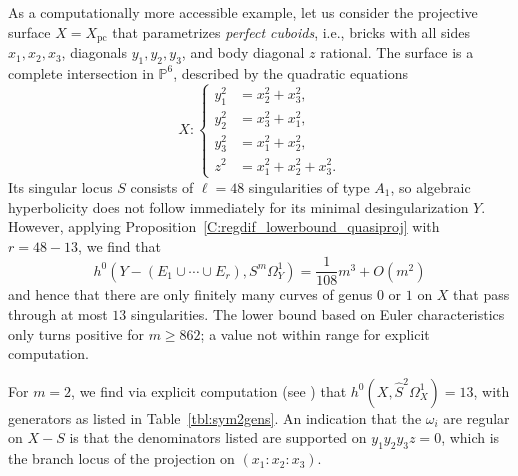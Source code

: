 \documentclass[12pt, reqno]{amsart}
\theoremstyle{definition}
\newcommand{\PP}{{\mathbb P}}
\newcommand{\Xpc}{X_\mathrm{pc}}
\numberwithin{equation}{section}
\numberwithin{table}{section}
\begin{document}
As a computationally more accessible example, let us consider the projective surface $X=\Xpc$ that parametrizes \emph{perfect cuboids}, i.e., bricks with all sides $x_1,x_2,x_3$, diagonals $y_1,y_2,y_3$, and body diagonal $z$ rational. The surface is a complete intersection in $\PP^6$, described by the quadratic equations
\[X\colon
\left\{
\begin{aligned}
y_1^2&=x_2^2+x_3^2,\\
y_2^2&=x_3^2+x_1^2,\\
y_3^2&=x_1^2+x_2^2,\\
z^2&=x_1^2+x_2^2+x_3^2.
\end{aligned}\right.
\]
Its singular locus $S$ consists of $\ell=48$ singularities of type $A_1$, so algebraic hyperbolicity does not follow immediately for its minimal desingularization $Y$. However, applying Proposition~\ref{C:regdif_lowerbound_quasiproj} with $r=48-13$, we find that
\[h^0(Y-(E_1\cup\cdots\cup E_r),S^m\Omega^1_Y)=\frac{1}{108}m^3+O(m^2)\]
and hence that there are only finitely many curves of genus $0$ or $1$ on $X$ that pass through at most $13$ singularities. The lower bound based on Euler characteristics only turns positive for $m\geq 862$; a value not within range for explicit computation.

For $m=2$, we find via explicit computation (see \cite{electronic}) that $h^0(X,\hat{S}^2\Omega^1_X)=13$, with generators as listed in Table~\ref{tbl:sym2gens}. An indication that the $\omega_i$ are regular on $X-S$ is that the denominators listed are supported on $y_1y_2y_3z=0$, which is the branch locus of the projection on $(x_1:x_2:x_3)$.
\end{document}
